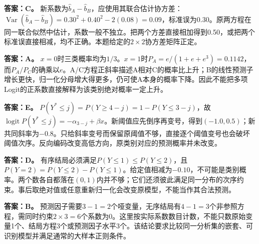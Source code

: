 \textbf{答案：C。} 新系数为$\hat b_A-\hat b_B$，应使用其联合估计协方差：$\operatorname{Var}(\hat b_A-\hat b_B)=0.30^2+0.40^2-2(0.08)=0.09$，标准误为0.30。原两方程在同一联合似然中估计，系数一般不独立。把两个方差直接相加得到0.50，或把两个标准误直接相减，均不正确。本题给定的$2\times2$协方差矩阵正定。
\par\nobreak\smallskip{}

\textbf{答案：A。} $x=0$时三类概率均为$1/3$。$x=1$时$P_A=e/(1+e+e^3)=0.1142$，而$P_A/P_C$的确乘以$e$。A/C方程正斜率描述A相对C的概率比上升；B的线性预测子增长更快，归一化分母增大得更多，仍可使A本身的概率下降。因此不能把多项Logit的正系数直接解释为该类别绝对概率一定上升。
\par\nobreak\smallskip{}

\textbf{答案：E。} $P(Y^\ast\le j)=P(Y\ge4-j)=1-P(Y\le3-j)$，故$\operatorname{logit}P(Y^\ast\le j)=-\alpha_{3-j}+\beta x$。新阈值应先倒序再变号，得到$(-1.0,0.5)$；新共同斜率为$-0.8$。只给斜率变号而保留原阈值不够，直接逐个阈值变号也会破坏阈值次序。反向编码改变高低方向，原类别对应的预测概率并未改变。
\par\nobreak\smallskip{}

\textbf{答案：D。} 有序结局必须满足$P(Y\le1)\le P(Y\le2)$，且$P(Y=2)=P(Y\le2)-P(Y\le1)$。给定值相减为$-0.10$，不可能是类别概率。两个数各自都落在$(0,1)$内并不够；它们还须彼此满足同一分布的次序约束。事后取绝对值或任意重新归一化会改变原模型，不能当作其合法预测。
\par\nobreak\smallskip{}

\textbf{答案：B。} 预测因子需要$3-1=2$个哑变量，无序结局有$4-1=3$个非参照方程，需同时约束$2\times3=6$个系数为0。这里按实际系数数目计数，不能只数原始变量1个、结局方程3个或预测因子水平3个。该结论要求比较同一分析集的嵌套、可识别模型并满足通常的大样本正则条件。
\par\nobreak\smallskip{}

